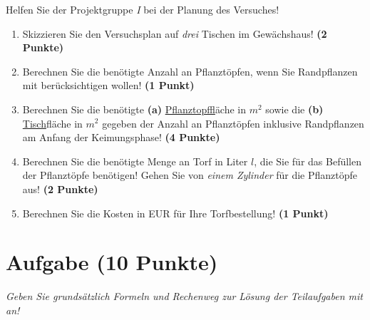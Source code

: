 \documentclass[a4paper, 9pt]{scrartcl}\usepackage[]{graphicx}\usepackage[]{xcolor}
\begin{document}
\vspace{1Ex}

Helfen Sie der Projektgruppe \textit{I} bei der Planung des Versuches! 

\begin{enumerate}
\item Skizzieren Sie den Versuchsplan auf \textit{drei} Tischen im Gewächshaus! \textbf{(2 Punkte)}
\item Berechnen Sie die benötigte Anzahl an Pflanztöpfen, wenn Sie Randpflanzen mit berücksichtigen wollen! \textbf{(1 Punkt)}
\item Berechnen Sie die benötigte \textbf{(a)} \underline{Pflanztopf}fläche in $m^2$ sowie die \textbf{(b)} \underline{Tisch}fläche in $m^2$ gegeben der Anzahl an Pflanztöpfen inklusive Randpflanzen am Anfang der Keimungsphase! \textbf{(4 Punkte)}
\item Berechnen Sie die benötigte Menge an Torf in Liter $l$, die Sie für das Befüllen der Pflanztöpfe benötigen! Gehen Sie von \textit{einem Zylinder} für die Pflanztöpfe aus!  \textbf{(2 Punkte)}
\item Berechnen Sie die Kosten in EUR für Ihre Torfbestellung! \textbf{(1 Punkt)}
\end{enumerate}




 
\clearpage

\section{Aufgabe \hfill (10 Punkte)}

\textit{Geben Sie grundsätzlich Formeln und Rechenweg zur Lösung der Teilaufgaben mit an!} \\[1Ex]
 
\end{document}
